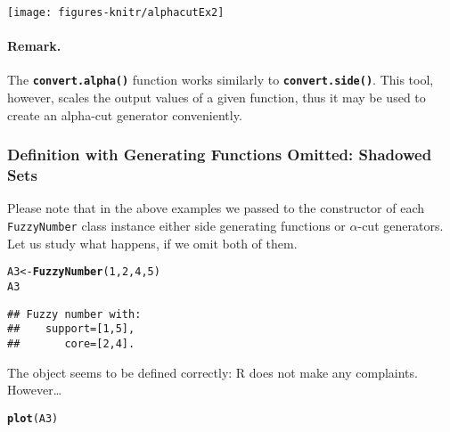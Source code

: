 \documentclass[11pt]{article}\usepackage{graphicx, color}
\makeatletter
\newcommand{\hlfunctioncall}[1]{\textcolor[rgb]{0.501960784313725,0,0.329411764705882}{\textbf{#1}}}%
\newenvironment{kframe}{%
 \def\at@end@of@kframe{}%
 \ifinner\ifhmode%
  \def\at@end@of@kframe{\end{minipage}}%
  \begin{minipage}{\columnwidth}%
 \fi\fi%
 \def\FrameCommand##1{\hskip\@totalleftmargin \hskip-\fboxsep
 \colorbox{shadecolor}{##1}\hskip-\fboxsep
     \hskip-\linewidth \hskip-\@totalleftmargin \hskip\columnwidth}%
 \MakeFramed {\advance\hsize-\width
   \@totalleftmargin\z@ \linewidth\hsize
   \@setminipage}}%
 {\par\unskip\endMakeFramed%
 \at@end@of@kframe}
\newenvironment{knitrout}{}{} %
\newcommand{\lang}[1]{\textsf{#1}\xspace}
\newcommand{\R}{\lang{R}}
\newcommand{\func}[1]{\texttt{\hlfunctioncall{#1}}}
\makeatother
\begin{document}
\begin{center}
\begin{knitrout}\small
{}\color{fgcolor}

{\centering \texttt{[image: figures-knitr/alphacutEx2]} 

}



\end{knitrout}

\end{center}




\paragraph{Remark.}
The \func{convert.alpha()} function
works similarly to \func{convert.side()}.
This tool, however, scales the output values
of a given function, thus it may be used to create
an alpha-cut generator conveniently.

\subsubsection{Definition with Generating Functions Omitted: Shadowed Sets}

Please note that in the above examples we passed to the
constructor of each \texttt{FuzzyNumber} class instance
either side generating functions or $\alpha$-cut generators.
Let us study what happens, if we omit both of them.

\begin{knitrout}\small
{}\color{fgcolor}\begin{kframe}
\begin{alltt}
A3 <- \hlfunctioncall{FuzzyNumber}(1, 2, 4, 5)
A3
\end{alltt}
\begin{verbatim}
## Fuzzy number with:
##    support=[1,5],
##       core=[2,4].
\end{verbatim}
\end{kframe}
\end{knitrout}


\noindent
The object seems to be defined correctly: \R does not make any
complaints. However\dots

\begin{knitrout}\small
{}\color{fgcolor}\begin{kframe}
\begin{alltt}
\hlfunctioncall{plot}(A3)
\end{alltt}
\end{kframe}
\end{knitrout}
\end{document}
